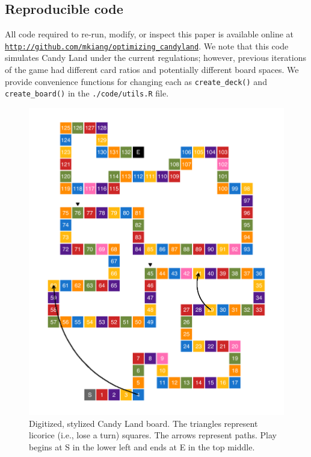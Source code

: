 \documentclass[letterpaper,9pt,twocolumn,twoside,]{pinp}
\begin{document}
\hypertarget{reproducible-code}{%
\subsection{Reproducible code}\label{reproducible-code}}

All code required to re-run, modify, or inspect this paper is available
online at
\href{http://github.com/mkiang/optimizing_candyland}{\texttt{http://github.com/mkiang/optimizing\_candyland}}.
We note that this code simulates Candy Land under the current
regulations; however, previous iterations of the game had different card
ratios and potentially different board spaces. We provide convenience
functions for changing each as \texttt{create\_deck()} and
\texttt{create\_board()} in the \texttt{./code/utils.R} file.

\begin{figure}
  \begin{center}
    \includegraphics[width=4.5in]{./../../plots/p1_board.pdf}
    \caption{Digitized, stylized Candy Land board. The triangles represent licorice (i.e., lose a turn) squares. The arrows represent paths. Play begins at S in the lower left and ends at E in the top middle.}
    \label{fig:p1_board}
  \end{center}
\end{figure}
\end{document}

